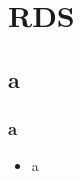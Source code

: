 \section{RDS}

\subsection{a}

\begin{frame}
	\frametitle{a}
	\begin{itemize}
		\item a
	\end{itemize}
\end{frame}
